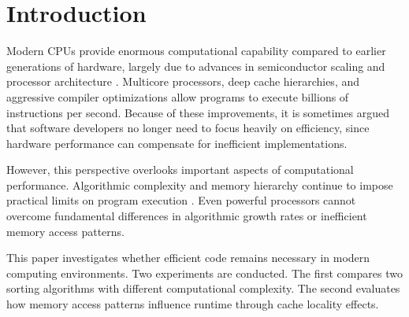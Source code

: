 \section{Introduction}

Modern CPUs provide enormous computational capability compared to earlier generations of hardware, largely due to advances in semiconductor scaling and processor architecture \cite{moore1965, dennard1974}. Multicore processors, deep cache hierarchies, and aggressive compiler optimizations allow programs to execute billions of instructions per second. Because of these improvements, it is sometimes argued that software developers no longer need to focus heavily on efficiency, since hardware performance can compensate for inefficient implementations.

However, this perspective overlooks important aspects of computational performance. Algorithmic complexity and memory hierarchy continue to impose practical limits on program execution \cite{wulf1995}. Even powerful processors cannot overcome fundamental differences in algorithmic growth rates or inefficient memory access patterns.

This paper investigates whether efficient code remains necessary in modern computing environments. Two experiments are conducted. The first compares two sorting algorithms with different computational complexity. The second evaluates how memory access patterns influence runtime through cache locality effects.
